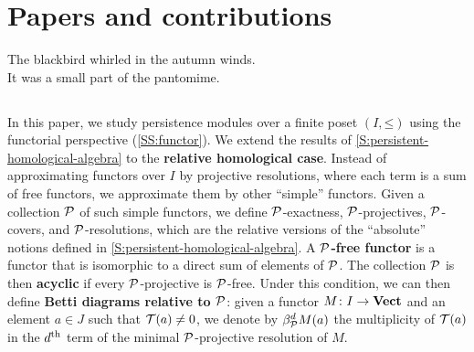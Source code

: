
\let\theoldsection\thesection%
\renewcommand{\thesection}{\Alph{section}}%
\let\oldsectionmark\sectionmark
\renewcommand{\sectionmark}[1]{\markright{\MakeUppercase{\papername\ \thesection. \ #1}}}

\chapter{Papers and contributions}
\label{C:contributions}

\begin{epigraph}
  The blackbird whirled in the autumn winds. \\
  It was a small part of the pantomime.
\end{epigraph}
\vspace{-1\baselineskip}

\section[Koszul complexes and relative homological algebra]{}

In this paper, we study persistence modules over a finite poset $(I, \mathord{\leq})$ using the functorial perspective (\cref{SS:functor}). We extend the results of \cref{S:persistent-homological-algebra} to the \textbf{relative homological case}. Instead of approximating functors over $I$ by projective resolutions, where each term is a sum of free functors, we approximate them by other ``simple'' functors. Given a collection $\mathcal{P}$ of such simple functors, we define $\mathcal{P}$-exactness, $\mathcal{P}$-projectives, $\mathcal{P}$-covers, and $\mathcal{P}$-resolutions, which are the relative versions of the ``absolute'' notions defined in \cref{S:persistent-homological-algebra}. A \textbf{$\mathcal{P}$-free functor} is a functor that is isomorphic to a direct sum of elements of $\mathcal{P}$. The collection $\mathcal{P}$ is then \textbf{acyclic} if every $\mathcal{P}$-projective is $\mathcal{P}$-free. Under this condition, we can then define \textbf{Betti diagrams relative to $\mathcal{P}$}: given a functor $M \colon I \to \operatorname{\mathbf{Vect}}$ and an element $a \in J$ such that $\mathcal{T}(a) \neq 0$, we denote by $\beta_{\mathcal{P}}^d M(a)$ the multiplicity of $\mathcal{T}(a)$ in the $d^{\text{th}}$ term of the minimal $\mathcal{P}$-projective resolution of $M$.


